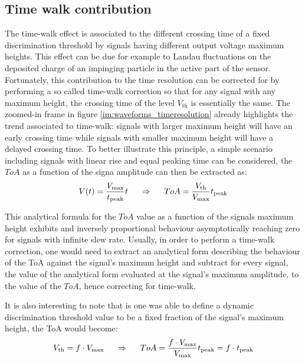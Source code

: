 		\subsection{Time walk contribution}
		The time-walk effect is associated to the different crossing time of a fixed discrimination threshold by signals having different output voltage maximum heights. This effect can be due for example to Landau fluctuations on the deposited charge of an impinging particle in the active part of the sensor. Fortunately, this contribution to the time resolution can be corrected for by performing a so called time-walk correction so that for any signal with any maximum height, the crossing time of the level $V_{\text{th}}$ is essentially the same. The zoomed-in frame in figure \ref{im:waveforms_timeresolution} already highlights the trend associated to time-walk: signals with larger maximum height will have an early crossing time while signals with smaller maximum height will have a delayed crossing time. To better illustrate this principle, a simple scenario including signals with linear rise and equal peaking time can be considered, the $ToA$ as a function of the signa amplitude can then be extracted as: 
		\begin{equation}
			V(t) = \frac{V_{\text{max}}}{t_{\text{peak}}} t \hspace{5mm} \Rightarrow \hspace{5mm} ToA = \frac{V_{\text{th}}}{V_{\text{max}}} t_{\text{peak}}
		\end{equation}
		
		This analytical formula for the $ToA$ value as a function of the signals maximum height exhibits and inversely proportional behaviour asymptotically reaching zero for signals with infinite slew rate. Usually, in order to perform a time-walk correction, one would need to extract an analytical form describing the behaviour of the ToA against the signal's maximum height and subtract for every signal, the value of the analytical form evaluated at the signal's maximum amplitude, to the value of the $ToA$, hence correcting for time-walk. 
		
		It is also interesting to note that is one was able to define a dynamic discrimination threshold value to be a fixed fraction of the signal's maximum height, the ToA would become: 
		\begin{equation}
			V_{\text{th}} = f \cdot V_{\text{max}} \hspace{5mm} \Rightarrow \hspace{5mm} ToA = \frac{f \cdot V_{\text{max}}}{V_{\text{max}}} t_{\text{peak}} = f \cdot t_{\text{peak}} 
		\end{equation}
		
